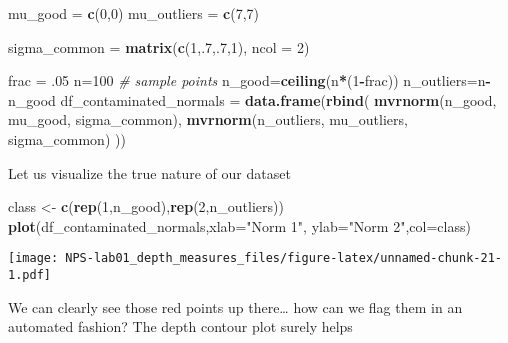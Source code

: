 \documentclass[
]{article}
\newenvironment{Shaded}{\begin{snugshade}}{\end{snugshade}}
\newcommand{\AttributeTok}[1]{\textcolor[rgb]{0.13,0.29,0.53}{#1}}
\newcommand{\CommentTok}[1]{\textcolor[rgb]{0.56,0.35,0.01}{\textit{#1}}}
\newcommand{\DecValTok}[1]{\textcolor[rgb]{0.00,0.00,0.81}{#1}}
\newcommand{\FunctionTok}[1]{\textcolor[rgb]{0.13,0.29,0.53}{\textbf{#1}}}
\newcommand{\NormalTok}[1]{#1}
\newcommand{\OtherTok}[1]{\textcolor[rgb]{0.56,0.35,0.01}{#1}}
\newcommand{\SpecialCharTok}[1]{\textcolor[rgb]{0.81,0.36,0.00}{\textbf{#1}}}
\newcommand{\StringTok}[1]{\textcolor[rgb]{0.31,0.60,0.02}{#1}}
\begin{document}
\begin{Shaded}
\begin{Highlighting}[]
\NormalTok{mu\_good }\OtherTok{=} \FunctionTok{c}\NormalTok{(}\DecValTok{0}\NormalTok{,}\DecValTok{0}\NormalTok{) }
\NormalTok{mu\_outliers }\OtherTok{=} \FunctionTok{c}\NormalTok{(}\DecValTok{7}\NormalTok{,}\DecValTok{7}\NormalTok{)}

\NormalTok{sigma\_common }\OtherTok{=} \FunctionTok{matrix}\NormalTok{(}\FunctionTok{c}\NormalTok{(}\DecValTok{1}\NormalTok{,.}\DecValTok{7}\NormalTok{,.}\DecValTok{7}\NormalTok{,}\DecValTok{1}\NormalTok{), }\AttributeTok{ncol =} \DecValTok{2}\NormalTok{)}

\NormalTok{frac }\OtherTok{=}\NormalTok{ .}\DecValTok{05}
\NormalTok{n}\OtherTok{=}\DecValTok{100}
\CommentTok{\# sample points}
\NormalTok{n\_good}\OtherTok{=}\FunctionTok{ceiling}\NormalTok{(n}\SpecialCharTok{*}\NormalTok{(}\DecValTok{1}\SpecialCharTok{{-}}\NormalTok{frac))}
\NormalTok{n\_outliers}\OtherTok{=}\NormalTok{n}\SpecialCharTok{{-}}\NormalTok{n\_good}
\NormalTok{df\_contaminated\_normals }\OtherTok{=} \FunctionTok{data.frame}\NormalTok{(}\FunctionTok{rbind}\NormalTok{(}
  \FunctionTok{mvrnorm}\NormalTok{(n\_good, mu\_good, sigma\_common),}
  \FunctionTok{mvrnorm}\NormalTok{(n\_outliers, mu\_outliers, sigma\_common)}
\NormalTok{))}
\end{Highlighting}
\end{Shaded}

Let us visualize the true nature of our dataset

\begin{Shaded}
\begin{Highlighting}[]
\NormalTok{class }\OtherTok{\textless{}{-}} \FunctionTok{c}\NormalTok{(}\FunctionTok{rep}\NormalTok{(}\DecValTok{1}\NormalTok{,n\_good),}\FunctionTok{rep}\NormalTok{(}\DecValTok{2}\NormalTok{,n\_outliers))}
\FunctionTok{plot}\NormalTok{(df\_contaminated\_normals,}\AttributeTok{xlab=}\StringTok{"Norm 1"}\NormalTok{, }\AttributeTok{ylab=}\StringTok{"Norm 2"}\NormalTok{,}\AttributeTok{col=}\NormalTok{class)}
\end{Highlighting}
\end{Shaded}

\texttt{[image: NPS-lab01\_depth\_measures\_files/figure-latex/unnamed-chunk-21-1.pdf]}

We can clearly see those red points up there\ldots{} how can we flag
them in an automated fashion? The depth contour plot surely helps
\end{document}
